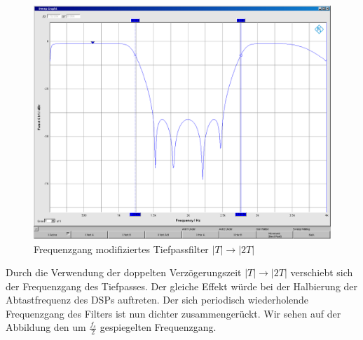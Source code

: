	\begin{figure}[h]
		\centering
		\includegraphics[width=0.7\linewidth]{Bilder/ellip2T}
		\caption{Frequenzgang modifiziertes Tiefpassfilter $|T| \rightarrow |2T|$}
		\label{fig:ellip2T}
	\end{figure}
	
\noindent Durch die Verwendung der doppelten Verzögerungszeit $|T| \rightarrow |2T|$ verschiebt sich der Frequenzgang des Tiefpasses. Der gleiche Effekt würde bei der Halbierung der Abtastfrequenz des DSPs auftreten. Der sich periodisch wiederholende Frequenzgang des Filters ist nun dichter zusammengerückt. Wir sehen auf der Abbildung den um $\frac{f_s}{2}$ gespiegelten Frequenzgang. 
